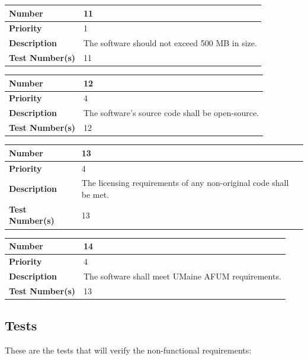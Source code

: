 \documentclass{article}
\begin{document}
\begin{center}
\bigskip
{}
\begin{tabular}{|p{3.5cm}|p{7.5cm}|} 
\hline
\textbf{Number} & 11  \\
\hline
\textbf{Priority} & 1 \\ 
\hline
\textbf{Description} & The software should not exceed 500 MB in size. \\ 
\hline
\textbf{Test Number(s) }& 11 \\ 
\hline
\end{tabular}


\bigskip
{}
\begin{tabular}{|p{3.5cm}|p{7.5cm}|} 
\hline
\textbf{Number} & 12  \\
\hline
\textbf{Priority} & 4\\ 
\hline
\textbf{Description} & The software's source code shall be open-source. \\ 
\hline
\textbf{Test Number(s) }& 12\\ 
\hline
\end{tabular}


\bigskip
{}
\begin{tabular}{|p{3.5cm}|p{7.5cm}|} 
\hline
\textbf{Number} & 13  \\
\hline
\textbf{Priority} & 4 \\ 
\hline
\textbf{Description} & The licensing requirements of any non-original code shall be met.\\ 
\hline
\textbf{Test Number(s) }& 13 \\ 
\hline
\end{tabular}

\bigskip
{}
\begin{tabular}{|p{3.5cm}|p{7.5cm}|} 
\hline
\textbf{Number} & 14  \\
\hline
\textbf{Priority} & 4 \\ 
\hline
\textbf{Description} & The software shall meet UMaine AFUM requirements.\\ 
\hline
\textbf{Test Number(s) }& 13 \\ 
\hline
\end{tabular}

\end{center}

\subsection{Tests}

These are the tests that will verify the non-functional requirements:
\end{document}
